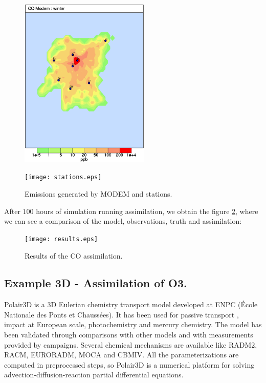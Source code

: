 \documentclass[12pt]{article}
\begin{document}
\begin{figure}[htbp]
\centering
\begin{minipage}{7cm}
\includegraphics[width=6.2cm]{emissions.eps}  
\end{minipage}
\begin{minipage}{7cm}
\texttt{[image: stations.eps]}  
\end{minipage}
\caption{Emissions generated by MODEM and stations.}
\label{stationsemissions}
\end{figure}

After $100$ hours of simulation running assimilation, we obtain the figure \ref{results}, where we can see a comparison of the model, observations, truth and assimilation:
\begin{figure}[htb]
\begin{center}
\texttt{[image: results.eps]}
\caption{Results of the CO assimilation.}
\label{results}
\end{center}
\end{figure}

\subsection{Example 3D - Assimilation of O3.}
Polair3D \cite{POLAIR3Dmodel} is a 3D Eulerian chemistry transport model developed at ENPC (\'Ecole Nationale des Ponts et Chauss\'ees). It has been used for passive transport \cite{issartel2003}, impact at European scale, photochemistry \cite{sartelet2002} and mercury chemistry. The model has been validated through comparisons with other models and with measurements provided by campaigns. Several chemical mechanisms are available like RADM2, RACM, EURORADM, MOCA and CBMIV. All the parameterizations are computed in preprocessed steps, so Polair3D is a numerical platform for solving advection-diffusion-reaction partial differential equations. 
\end{document}
